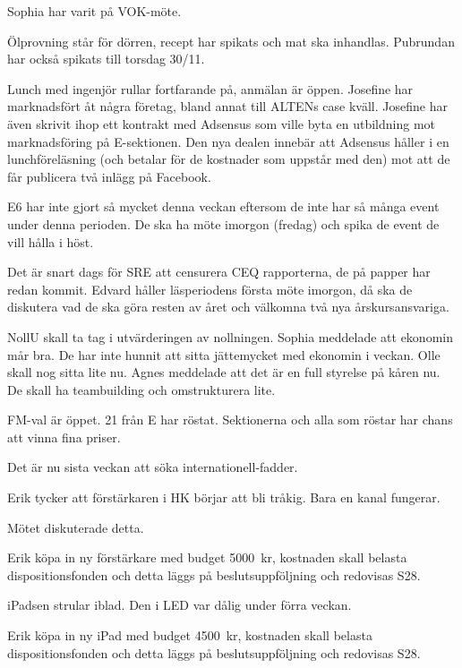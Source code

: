 \documentclass[10pt]{article}
\begin{document}
\begin{paragrafer}
\begin{paragrafer}
Sophia har varit på VOK-möte.

Ölprovning står för dörren, recept har spikats och mat ska inhandlas. Pubrundan har också spikats till torsdag 30/11.

Lunch med ingenjör rullar fortfarande på, anmälan är öppen. Josefine har marknadsfört åt några företag, bland annat till ALTENs case kväll. Josefine har även skrivit ihop ett kontrakt med Adsensus som ville byta en utbildning mot marknadsföring på E-sektionen. Den nya dealen innebär att Adsensus håller i en lunchföreläsning (och betalar för de kostnader som uppstår med den) mot att de får publicera två inlägg på Facebook.

E6 har inte gjort så mycket denna veckan eftersom de inte har så många event under denna perioden. De ska ha möte imorgon (fredag) och spika de event de vill hålla i höst.

Det är snart dags för SRE att censurera CEQ rapporterna, de på papper har redan kommit. Edvard håller läsperiodens första möte imorgon, då ska de diskutera vad de ska göra resten av året och välkomna två nya årskursansvariga.

NollU skall ta tag i utvärderingen av nollningen.
Sophia meddelade att ekonomin mår bra. De har inte hunnit att sitta jättemycket med ekonomin i veckan. Olle skall nog sitta lite nu.
\newpage
{}
Agnes meddelade att det är en full styrelse på kåren nu. De skall ha teambuilding och omstrukturera lite.

FM-val är öppet. 21 från E har röstat. Sektionerna och alla som röstar har chans att vinna fina priser.

Det är nu sista veckan att söka internationell-fadder.
\end{paragrafer}

Erik tycker att förstärkaren i HK börjar att bli tråkig. Bara en kanal fungerar.

Mötet diskuterade detta.

Erik \ypa köpa in ny förstärkare med budget \SI{5000}{kr}, kostnaden skall belasta dispositionsfonden och detta läggs på beslutsuppföljning och redovisas S28.

\Mbaby
{}
iPadsen strular iblad. Den i LED var dålig under förra veckan.

Erik \ypa köpa in ny iPad med budget \SI{4500}{kr}, kostnaden skall belasta dispositionsfonden och detta läggs på beslutsuppföljning och redovisas S28.


\end{paragrafer}
\end{document}
